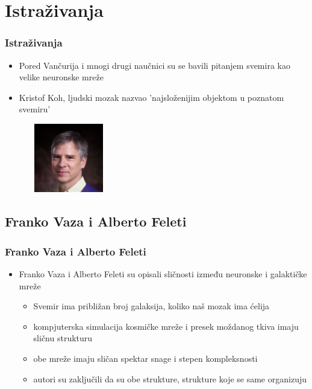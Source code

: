 \documentclass{beamer}
\begin{document}
\section{Istraživanja}
    \begin{frame}[fragile]\frametitle{Istraživanja}
	   \begin{itemize}	
            \item Pored Vančurija i mnogi drugi naučnici su se bavili pitanjem svemira kao velike neuronske mreže
            \item Kristof Koh, ljudski mozak nazvao 'najsloženijim objektom u poznatom svemiru'
	   \end{itemize}
   
          \begin{figure}[h]
           \centering
           \includegraphics[width=35mm,height=30mm, scale=0.5] 
             {koh.jpg}
          \label{fig:koh.jpg}
          \end{figure}
          \end{frame}
          
\subsection{Franko Vaza i Alberto Feleti}
    \begin{frame}[fragile]\frametitle{Franko Vaza i Alberto Feleti}
	   \begin{itemize}	
		  \item Franko Vaza i Alberto Feleti su opisali sličnosti između neuronske i galaktičke mreže
            \begin{itemize}
                \item Svemir ima približan broj galaksija, koliko naš mozak ima ćelija 
                \item kompjuterska simulacija kosmičke mreže i presek moždanog tkiva imaju sličnu strukturu
                \item obe mreže imaju sličan spektar snage i stepen kompleksnosti 
                \item autori su zaključili da su obe strukture, strukture koje se same organizuju
            \end{itemize}
	   \end{itemize}
    \end{frame}
\end{document}
